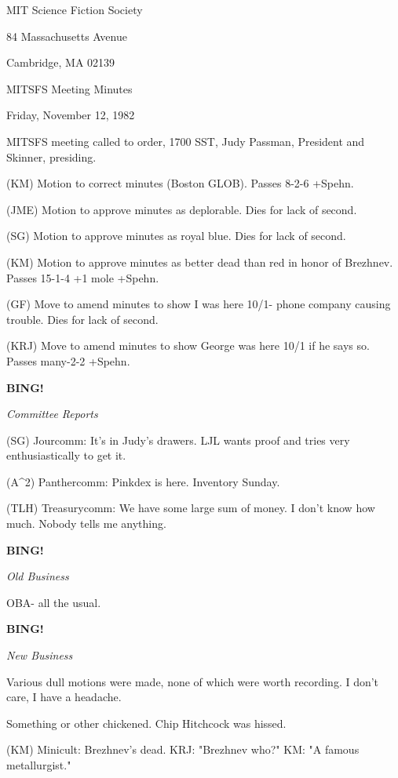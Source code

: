 \documentclass[12pt]{article}
\newcommand{\bing}{{\bf BING!} }
\newcommand{\goto}[1]{\bing \vskip 12pt \centerline{{\em{#1}}}}
\begin{document}
\begin{center}

MIT Science Fiction Society 

84 Massachusetts Avenue

Cambridge, MA 02139

\vspace{12pt}

MITSFS Meeting Minutes 

Friday, November 12, 1982

\end{center}
 
\vspace{18pt}

\setlength{\parskip}{6pt}

\noindent
MITSFS meeting called to order, 1700 SST,
Judy Passman, President and Skinner, presiding.

(KM) Motion to correct minutes (Boston GLOB). Passes 8-2-6 +Spehn.

(JME) Motion to approve minutes as deplorable. Dies for lack of second.

(SG) Motion to approve minutes as royal blue. Dies for lack of second.

(KM) Motion to approve minutes as better dead than red in honor of Brezhnev. Passes 15-1-4 +1 mole +Spehn.

(GF) Move to amend minutes to show I was here 10/1- phone company causing trouble. Dies for lack of second.

(KRJ) Move to amend minutes to show George was here 10/1 if he says so. Passes many-2-2 +Spehn.

\goto{Committee Reports}

(SG) Jourcomm: It's in Judy's drawers. LJL wants proof and tries very enthusiastically to get it.

(A^2) Panthercomm: Pinkdex is here. Inventory Sunday.

(TLH) Treasurycomm: We have some large sum of money. I don't know how much. Nobody tells me anything.

\goto{Old Business}

OBA- all the usual.

\goto{New Business}

Various dull motions were made, none of which were worth recording. I don't care, I have a headache.

Something or other chickened. Chip Hitchcock was hissed.

(KM) Minicult: Brezhnev's dead. KRJ: "Brezhnev who?" KM: "A famous metallurgist."
\end{document}
